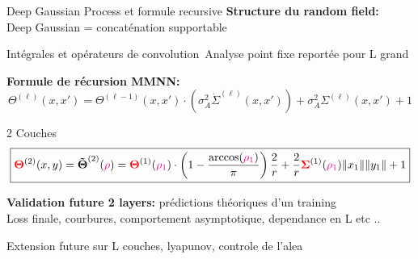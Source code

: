 \documentclass{beamer}
\begin{document}

    
\begin{frame}{Deep Gaussian Process et formule recursive}
    \textbf{Structure du random field:}\\
    Deep Gaussian = concaténation supportable


\vspace{0.5cm}

Intégrales et opérateurs de convolution\ Analyse point fixe reportée pour L grand


\vspace{0.3cm}

\textbf{Formule de récursion MMNN:}
\begin{equation}
\boxed{
\Theta^{(\ell)}(x, x') = \Theta^{(\ell-1)}(x, x') \cdot \left(\sigma_A^2\dot{\Sigma}^{(\ell)}(x, x')\right) + \sigma_A^2 \Sigma^{(\ell)}(x, x') + 1
}
\end{equation}
\end{frame}

\begin{frame}{2 Couches}
\begin{equation}
    \boxed{\textcolor{red}{\boldsymbol{\Theta}}^{(2)}(x,y) = \boldsymbol{\tilde{\Theta}}^{(2)}(\textcolor{magenta}{\rho}) = \textcolor{red}{\boldsymbol{\Theta}}^{(1)}(\textcolor{magenta}{\rho_1}) \cdot \left(1 - \frac{\arccos(\textcolor{magenta}{\rho_1})}{\pi}\right)\frac{2}{r} + \frac{2}{r}\textcolor{red}{\boldsymbol{\Sigma}}^{(1)}(\textcolor{magenta}{\rho_1})\|x_1\| \|y_1\| + 1}
\end{equation}

\textbf{Validation future 2 layers:} prédictions théoriques d'un training\\
Loss finale, courbures, comportement asymptotique, dependance en L etc ..

Extension future sur L couches, lyapunov, controle de l'alea
\end{frame}
\end{document}
